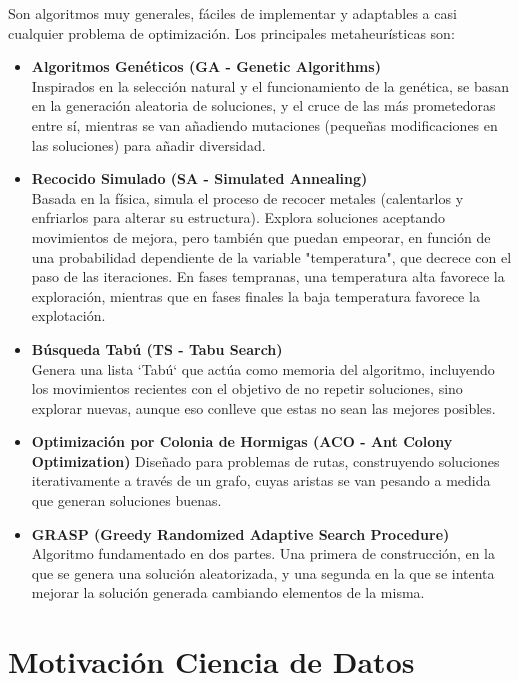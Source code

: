 \documentclass[12pt,a4paper]{book}
\begin{document}
Son algoritmos muy generales, fáciles de implementar y adaptables a casi 
cualquier problema de optimización. Los principales metaheurísticas son:
\begin{itemize}
    \item \textbf{Algoritmos Genéticos (GA - Genetic Algorithms)}\\
    Inspirados en la selección natural y el funcionamiento de la genética, se basan en la generación aleatoria de soluciones, y el cruce de las más prometedoras entre sí, 
    mientras se van añadiendo mutaciones (pequeñas modificaciones en las soluciones) para añadir diversidad.
    \item \textbf{Recocido Simulado (SA - Simulated Annealing)}\\
    Basada en la física, simula el proceso de recocer metales (calentarlos y enfriarlos para alterar su estructura). Explora soluciones aceptando movimientos de mejora, pero también que puedan empeorar, 
    en función de una probabilidad dependiente de la variable "temperatura", que decrece con el paso de las iteraciones. En fases tempranas, una temperatura alta favorece la exploración, mientras que en fases finales la baja temperatura favorece la explotación.
    \item \textbf{Búsqueda Tabú (TS - Tabu Search)}\\
    Genera una lista `Tabú` que actúa como memoria del algoritmo, incluyendo los movimientos recientes con el objetivo de no repetir soluciones, sino explorar nuevas, aunque eso conlleve que estas no sean las mejores posibles.
    \item \textbf{Optimización por Colonia de Hormigas (ACO - Ant Colony Optimization)}
    Diseñado para problemas de rutas, construyendo soluciones iterativamente a través de un grafo, cuyas aristas  se van pesando a medida que generan soluciones buenas.
    \item \textbf{GRASP (Greedy Randomized Adaptive Search Procedure)}\\
    Algoritmo fundamentado en dos partes. Una primera de construcción, en la que se genera una solución aleatorizada, y una segunda en la que se intenta mejorar la solución generada cambiando elementos de la misma.
\end{itemize}

\section{Motivación Ciencia de Datos}
\end{document}
